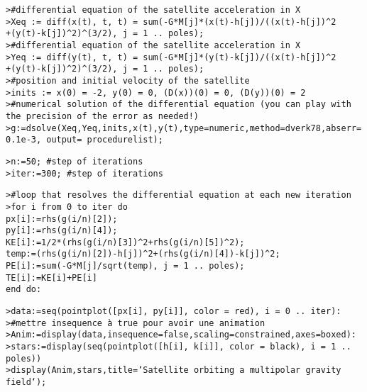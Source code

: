 	\texttt{>\#differential equation of the satellite acceleration in X\\
	>Xeq := diff(x(t), t, t) = sum(-G*M[j]*(x(t)-h[j])/((x(t)-h[j])\string^2\\+(y(t)-k[j])\string^2)\string^(3/2), j = 1 .. poles);\\
	>\#differential equation of the satellite acceleration in X\\
	>Yeq := diff(y(t), t, t) = sum(-G*M[j]*(y(t)-k[j])/((x(t)-h[j])\string^2\\+(y(t)-k[j])\string^2)\string^(3/2), j = 1 .. poles);\\
	>\#position and initial velocity of the satellite\\
	>inits := x(0) = -2, y(0) = 0, (D(x))(0) = 0, (D(y))(0) = 2\\
	>\#numerical solution of the differential equation (you can play with the precision of the error as needed!)\\
	>g:=dsolve({Xeq,Yeq,inits},{x(t),y(t)},type=numeric,method=dverk78,abserr=0.1e-3, output= procedurelist);\\}
	
	\texttt{>n:=50; \#step of iterations\\
	>iter:=300; \#step of iterations\\}
	
	\texttt{>\#loop that resolves the differential equation at each new iteration\\
	>for i from 0 to iter do \\
	px[i]:=rhs(g(i/n)[2]);\\
	py[i]:=rhs(g(i/n)[4]);\\
	KE[i]:=1/2*(rhs(g(i/n)[3])\string^2+rhs(g(i/n)[5])\string^2);\\
	temp:=(rhs(g(i/n)[2])-h[j])\string^2+(rhs(g(i/n)[4])-k[j])\string^2;\\
	PE[i]:=sum(-G*M[j]/sqrt(temp), j = 1 .. poles);\\
	TE[i]:=KE[i]+PE[i]\\
	end do:\\}
	
	\texttt{>data:=seq(pointplot([px[i], py[i]], color = red), i = 0 .. iter):\\
	>\#mettre insequence à true pour avoir une animation\\
	>Anim:=display(data,insequence=false,scaling=constrained,axes=boxed):\\
	>stars:=display(seq(pointplot([h[i], k[i]], color = black), i = 1 .. poles))\\
	>display({Anim,stars},title=`Satellite orbiting a multipolar gravity field`);\\}

